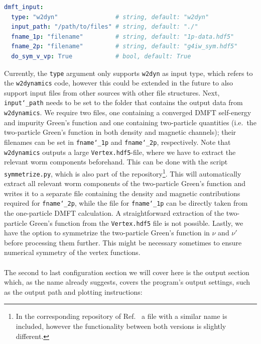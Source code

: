 \documentclass[../../main.tex]{subfiles}
\begin{document}
\begin{minipage}{\textwidth}%
\begin{lstlisting}[language=yaml]
dmft_input:
  type: "w2dyn"                # string, default: "w2dyn"
  input_path: "/path/to/files" # string, default: "./"
  fname_1p: "filename"         # string, default: "1p-data.hdf5"
  fname_2p: "filename"         # string, default: "g4iw_sym.hdf5"
  do_sym_v_vp: True            # bool, default: True
\end{lstlisting}
\end{minipage}
Currently, the \texttt{type} argument only supports \texttt{w2dyn} as input type, which refers to the \texttt{w2dynamics} code, however this could be extended in the future to also support input files from other sources with other file structures. Next, \texttt{input\char`_path} needs to be set to the folder that contains the output data from \texttt{w2dynamics}. We require two files, one containing a converged DMFT self-energy and impurity Green's function and one containing two-particle quantities (i.e.\ the two-particle Green's function in both density and magnetic channels); their filenames can be set in \texttt{fname\char`_1p} and \texttt{fname\char`_2p}, respectively. Note that \texttt{w2dynamics} outputs a large \texttt{Vertex.hdf5}-file, where we have to extract the relevant worm components beforehand. This can be done with the script \texttt{symmetrize.py}, which is also part of the repository\footnote{In the corresponding repository of Ref.~\cite{Galler2019} a file with a similar name is included, however the functionality between both versions is slightly different.}. This will automatically extract all relevant worm components of the two-particle Green's function and writes it to a separate file containing the density and magnetic contributions required for \texttt{fname\char`_2p}, while the file for \texttt{fname\char`_1p} can be directly taken from the one-particle DMFT calculation. A straightforward extraction of the two-particle Green's function from the \texttt{Vertex.hdf5} file is not possible. Lastly, we have the option to symmetrize the two-particle Green's function in $\nu$ and $\nu'$ before processing them further. This might be necessary sometimes to ensure numerical symmetry of the vertex functions.
\\\\
The second to last configuration section we will cover here is the output section which, as the name already suggests, covers the program's output settings, such as the output path and plotting instructions: 
 
\end{document}

